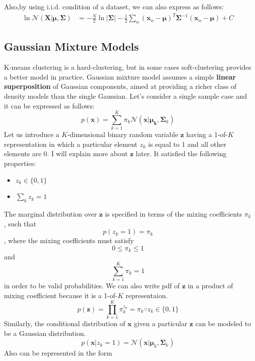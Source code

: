 Also,by using i.i.d. condition of a dataset, we can also express as follows:
\begin{align*}
	\ln\mathcal{N}(\mathbf{X}|\boldsymbol{\mu},\boldsymbol{\Sigma}) &= -\frac{N}{2}\ln|\boldsymbol{\Sigma}|-\frac{1}{2}\sum_n(\mathbf{x}_n-\boldsymbol{\mu})^T\boldsymbol{\Sigma}^{-1}(\mathbf{x}_n-\boldsymbol{\mu})+C
\end{align*}








\subsection{Gaussian Mixture Models}


K-means clustering is a hard-clustering, but in some cases soft-clustering provides a better model in practice. Gaussian mixture model assumes a simple \textbf{linear superposition} of Gaussian components, aimed at providing a richer class of density models than the single Gaussian. Let's consider a single sample case and it can be expressed as follows:
$$p(\mathbf{x})= \sum_{k=1}^{K}\pi_k\mathcal{N}(\mathbf{x}|\boldsymbol{\mu_k}, \boldsymbol{\Sigma}_k)$$
Let us introduce a $K$-dimensional binary random variable $\mathbf{z}$ having a 1-of-$K$ representation in which a particular element $z_k$ is equal to 1 and all other elements are 0. I will explain more about $\mathbf{z}$ later. It satisfied the following properties:
\begin{itemize}
	\item $z_k\in\{0,1\}$
	\item $\sum_kz_k=1$
\end{itemize}
The marginal distribution over $\mathbf{z}$ is specified in terms of the mixing coefficients $\pi_k$, such that 
$$p(z_k=1) = \pi_k$$
, where the mixing coefficients must satisfy
$$0\leq\pi_k\leq1$$
and 
$$\sum_{k=1}^{K}\pi_k = 1 $$
in order to be valid probabilities. We can also write pdf of $\mathbf{z}$ in a product of mixing coefficient because it is a 1-of-$K$ representaion.
$$p(\mathbf{z}) = \prod_{k=1}^{K}\pi_k^{z_k} = \pi_k \because z_k\in\{
0,1\}$$
Similarly, the conditional distribution of $\mathbf{x}$ given a particular $\mathbf{z}$ can be modeled to be a Gaussian distribution.
\begin{equation*}
p(\mathbf{x}|z_k=1) = \mathcal{N}(\mathbf{x}|\boldsymbol{\mu}_k, \boldsymbol{\Sigma}_k) 
\end{equation*}
Also can be represented in the form 
